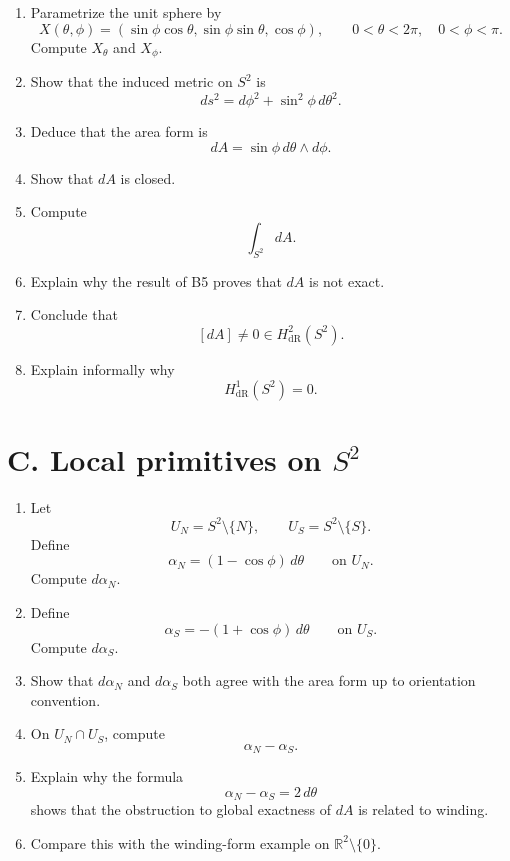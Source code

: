 \documentclass[11pt]{article}
\begin{document}
	\begin{enumerate}[leftmargin=2em,label=\textbf{B\arabic*.}]
		\item Parametrize the unit sphere by
		\[
		X(\theta,\phi)
		=
		(\sin\phi\cos\theta,\sin\phi\sin\theta,\cos\phi),
		\qquad
		0<\theta<2\pi,\quad 0<\phi<\pi.
		\]
		Compute \(X_\theta\) and \(X_\phi\).
		
		\item Show that the induced metric on \(S^2\) is
		\[
		ds^2=d\phi^2+\sin^2\phi\,d\theta^2.
		\]
		
		\item Deduce that the area form is
		\[
		dA=\sin\phi\,d\theta\wedge d\phi.
		\]
		
		\item Show that \(dA\) is closed.
		
		\item Compute
		\[
		\int_{S^2} dA.
		\]
		
		\item Explain why the result of B5 proves that \(dA\) is not exact.
		
		\item Conclude that
		\[
		[dA]\neq 0\in H^2_{\mathrm{dR}}(S^2).
		\]
		
		\item Explain informally why
		\[
		H^1_{\mathrm{dR}}(S^2)=0.
		\]
	\end{enumerate}
	
	\section*{C. Local primitives on \(S^2\)}
	
	\begin{enumerate}[leftmargin=2em,label=\textbf{C\arabic*.}]
		\item Let
		\[
		U_N=S^2\setminus\{N\},\qquad U_S=S^2\setminus\{S\}.
		\]
		Define
		\[
		\alpha_N=(1-\cos\phi)\,d\theta
		\qquad\text{on }U_N.
		\]
		Compute \(d\alpha_N\).
		
		\item Define
		\[
		\alpha_S=-(1+\cos\phi)\,d\theta
		\qquad\text{on }U_S.
		\]
		Compute \(d\alpha_S\).
		
		\item Show that \(d\alpha_N\) and \(d\alpha_S\) both agree with the area form up to orientation convention.
		
		\item On \(U_N\cap U_S\), compute
		\[
		\alpha_N-\alpha_S.
		\]
		
		\item Explain why the formula
		\[
		\alpha_N-\alpha_S=2\,d\theta
		\]
		shows that the obstruction to global exactness of \(dA\) is related to winding.
		
		\item Compare this with the winding-form example on \(\mathbb{R}^2\setminus\{0\}\).
	\end{enumerate}
	
\end{document}
